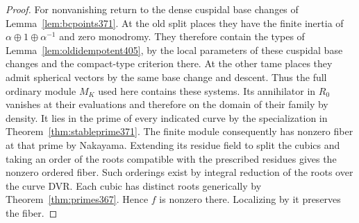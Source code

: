 \documentclass[a4paper,11pt]{article}
\theoremstyle{definition}
\theoremstyle{remark}
\numberwithin{equation}{section}
\begin{document}
\begin{proof}
For nonvanishing return to the dense cuspidal base changes
of Lemma~\ref{lem:bcpoints371}. At the old split places
they have the finite inertia of \(\alpha\oplus1\oplus\alpha^{-1}\)
and zero monodromy. They therefore contain the types of
Lemma~\ref{lem:oldidempotent405}, by the local parameters
of these cuspidal base changes and the compact-type criterion
there. At the other tame places they admit spherical vectors
by the same base change and descent. Thus the full ordinary
module \(M_K\) used here contains these systems. Its
annihilator in \(R_0\) vanishes at their evaluations and
therefore on the domain of their family by density. It
lies in the prime of every indicated curve by the
specialization in Theorem~\ref{thm:stableprime371}.
The finite module consequently has nonzero fiber at that
prime by Nakayama. Extending its residue field to split
the cubics and taking an order of the roots compatible
with the prescribed residues gives the nonzero ordered
fiber. Such orderings exist by integral reduction of the
roots over the curve DVR. Each cubic has distinct roots
generically by Theorem~\ref{thm:primes367}. Hence \(f\)
is nonzero there. Localizing by it preserves the fiber.
\end{proof}
\end{document}
